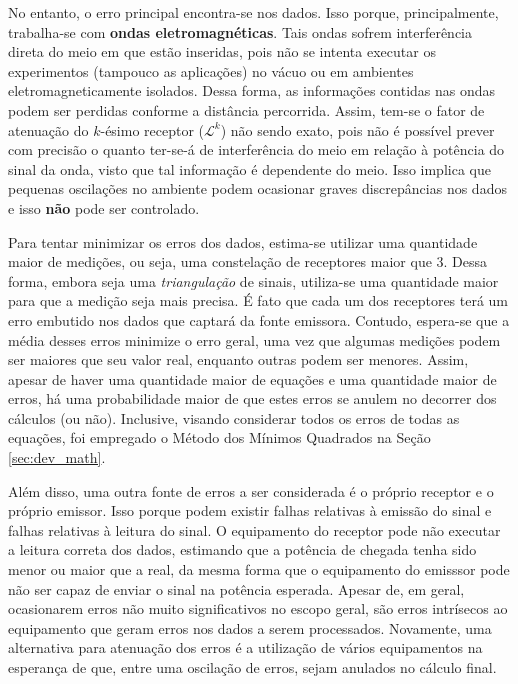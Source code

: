 	No entanto, o erro principal encontra-se nos dados. Isso porque, principalmente, trabalha-se com \textbf{ondas eletromagnéticas}. Tais
	ondas sofrem interferência direta do meio em que estão inseridas, pois não se intenta executar os experimentos (tampouco as aplicações)
	no vácuo ou em ambientes eletromagneticamente isolados. Dessa forma, as informações contidas nas ondas podem ser perdidas conforme a distância
	percorrida. Assim, tem-se o fator de atenuação do $k$-ésimo receptor ($\mathcal{L}^k$) não sendo exato, pois não é possível prever com precisão
	o quanto ter-se-á de interferência do meio em relação à potência do sinal da onda, visto que tal informação é dependente do meio. Isso implica
	que pequenas oscilações no ambiente podem ocasionar graves discrepâncias nos dados e isso \textbf{não} pode ser controlado.

	Para tentar minimizar os erros dos dados, estima-se utilizar uma quantidade maior de medições, ou seja, uma constelação de receptores maior que $3$.
	Dessa forma, embora seja uma \textit{triangulação} de sinais, utiliza-se uma quantidade maior para que a medição seja mais precisa. É fato que
	cada um dos receptores terá um erro embutido nos dados que captará da fonte emissora. Contudo, espera-se que a média desses erros minimize o erro geral,
	uma vez que algumas medições podem ser maiores que seu valor real, enquanto outras podem ser menores. Assim, apesar de haver uma quantidade maior
	de equações e uma quantidade maior de erros, há uma probabilidade maior de que estes erros se anulem no decorrer dos cálculos (ou não).
	Inclusive, visando considerar todos os erros de todas as equações, foi empregado o Método dos Mínimos Quadrados na Seção \ref{sec:dev_math}.

	Além disso, uma outra fonte de erros a ser considerada é o próprio receptor e o próprio emissor. Isso porque podem existir falhas relativas à
	emissão do sinal e falhas relativas à leitura do sinal. O equipamento do receptor pode não executar a leitura correta dos dados, estimando
	que a potência de chegada tenha sido menor ou maior que a real, da mesma forma que o equipamento do emisssor pode não ser capaz de enviar o sinal na
	potência esperada. Apesar de, em geral, ocasionarem erros não muito significativos no escopo geral, são erros intrísecos ao equipamento que geram
	erros nos dados a serem processados. Novamente, uma alternativa para atenuação dos erros é a utilização de vários equipamentos na esperança de que,
	entre uma oscilação de erros, sejam anulados no cálculo final.

